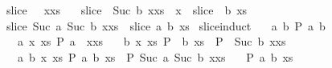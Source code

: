 \begin{isabellebody}
{\isacharbar}{\kern0pt}\ {\isachardoublequoteopen}slice\ {\isacharunderscore}{\kern0pt}\ {}\ {\isacharparenleft}{\kern0pt}x{\isacharhash}{\kern0pt}xs{\isacharparenright}{\kern0pt}\ {\isacharequal}{\kern0pt}\ {\isacharbrackleft}{\kern0pt}{\isacharbrackright}{\kern0pt}{\isachardoublequoteclose}\isanewline
{\isacharbar}{\kern0pt}\ {\isachardoublequoteopen}slice\ {}\ {\isacharparenleft}{\kern0pt}Suc\ b{\isacharparenright}{\kern0pt}\ {\isacharparenleft}{\kern0pt}x{\isacharhash}{\kern0pt}xs{\isacharparenright}{\kern0pt}\ {\isacharequal}{\kern0pt}\ x\ {\isacharhash}{\kern0pt}\ slice\ {}\ b\ xs{\isachardoublequoteclose}\isanewline
{\isacharbar}{\kern0pt}\ {\isachardoublequoteopen}slice\ {\isacharparenleft}{\kern0pt}Suc\ a{\isacharparenright}{\kern0pt}\ {\isacharparenleft}{\kern0pt}Suc\ b{\isacharparenright}{\kern0pt}\ {\isacharparenleft}{\kern0pt}x{\isacharhash}{\kern0pt}xs{\isacharparenright}{\kern0pt}\ {\isacharequal}{\kern0pt}\ slice\ a\ b\ xs{\isachardoublequoteclose}\isanewline
\isanewline
{}\isamarkupfalse%
\ slice{\isacharunderscore}{\kern0pt}induct{\isacharcolon}{\kern0pt}\isanewline
\ \ \ {\isachardoublequoteopen}{\isasymAnd}a\ b{\isachardot}{\kern0pt}\ P\ a\ b\ {\isacharbrackleft}{\kern0pt}{\isacharbrackright}{\kern0pt}{\isachardoublequoteclose}\isanewline
\ \ \ {\isachardoublequoteopen}{\isasymAnd}a\ x\ xs{\isachardot}{\kern0pt}\ P\ a\ {}\ {\isacharparenleft}{\kern0pt}x{\isacharhash}{\kern0pt}xs{\isacharparenright}{\kern0pt}{\isachardoublequoteclose}\isanewline
\ \ \ {\isachardoublequoteopen}{\isasymAnd}b\ x\ xs{\isachardot}{\kern0pt}\ P\ {}\ b\ xs\ {\isasymLongrightarrow}\ P\ {}\ {\isacharparenleft}{\kern0pt}Suc\ b{\isacharparenright}{\kern0pt}\ {\isacharparenleft}{\kern0pt}x{\isacharhash}{\kern0pt}xs{\isacharparenright}{\kern0pt}{\isachardoublequoteclose}\isanewline
\ \ \ {\isachardoublequoteopen}{\isasymAnd}a\ b\ x\ xs{\isachardot}{\kern0pt}\ P\ a\ b\ xs\ {\isasymLongrightarrow}\ P\ {\isacharparenleft}{\kern0pt}Suc\ a{\isacharparenright}{\kern0pt}\ {\isacharparenleft}{\kern0pt}Suc\ b{\isacharparenright}{\kern0pt}\ {\isacharparenleft}{\kern0pt}x{\isacharhash}{\kern0pt}xs{\isacharparenright}{\kern0pt}{\isachardoublequoteclose}\isanewline
\ \ \ {\isachardoublequoteopen}P\ a\ b\ xs{\isachardoublequoteclose}%
\isadelimproof
%
\endisadelimproof
%
\isatagproof
%
\endisatagproof
{\isafoldproof}%
%
\isadelimproof
\isanewline
%
\endisadelimproof
\isanewline
\isanewline
{}\isamarkupfalse%

\end{isabellebody}
